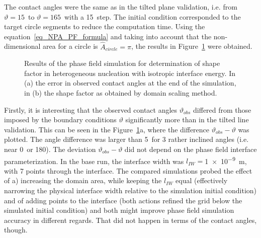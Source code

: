 	The contact angles were the same as in the tilted plane validation, i.e. from $\vartheta=15$\textdegree~to $\vartheta=165$\textdegree~with a 15\textdegree~step. The initial condition corresponded to the target circle segments to reduce the computation time. Using the equation~\eqref{eq_NPA_PF_formula} and taking into account that the non-dimensional area for a circle is $\hat{A}_{circle}=\pi$, the results in Figure~\ref{fig_result_NPA_PF_S_iso} were obtained.
	\begin{figure}
		\centering
		\caption[Results - shape factor for isotropic particle determined by domain scaling]{Results of the phase field simulation for determination of shape factor in heterogeneous nucleation with isotropic interface energy. In (a) the error in observed contact angles at the end of the simulation, in (b) the shape factor as obtained by domain scaling method.}
		\label{fig_result_NPA_PF_S_iso}
	\end{figure}
	
	Firstly, it is interesting that the observed contact angles $\vartheta_{obs}$ differed from those imposed by the boundary conditions $\vartheta$ significantly more than in the tilted line validation. This can be seen in the Figure~\ref{fig_result_NPA_PF_S_iso}a, where the difference $\vartheta_{obs}-\vartheta$ was plotted. The angle difference was larger than 5\textdegree~for 3 rather inclined angles (i.e. near 0\textdegree~or 180\textdegree). The deviation $\vartheta_{obs}-\vartheta$ did not depend on the phase field interface parameterization. In the base run, the interface width was $l_{IW}=$\qty{1e-9}{\m}, with 7 points through the interface. The compared simulations probed the effect of a) increasing the domain area, while keeping the $l_{IW}$ equal (effectively narrowing the physical interface width relative to the simulation initial condition) and of adding points to the interface (both actions refined the grid below the simulated initial condition) and both might improve phase field simulation accuracy in different regards. That did not happen in terms of the contact angles, though.
	
